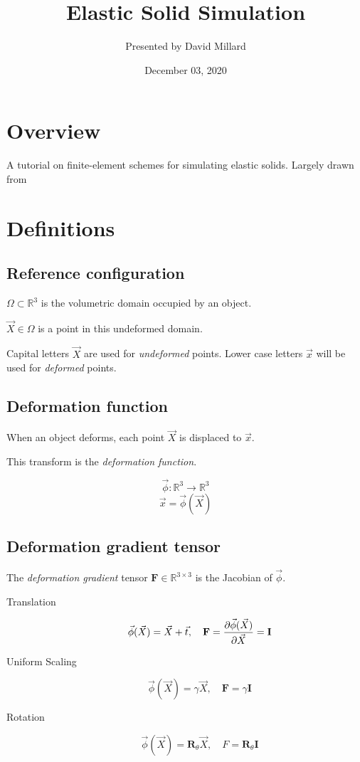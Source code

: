 \documentclass{article}
\title{Elastic Solid Simulation}
\author{Presented by David Millard}
\date{December 03, 2020}
\newcommand{\R}[1]{\ensuremath{\mathbb{R}^{#1}}}
\newcommand{\Rx}[2]{\ensuremath{\mathbb{R}^{#1 \times #2}}}
\newcommand{\vx}{\ensuremath{\vec{x}}}
\newcommand{\vX}{\ensuremath{\vec{X}}}
\newcommand{\vphi}{\ensuremath{\vec{\phi}}}
\newcommand{\vphiX}{\ensuremath{\vec{\phi}(\vX)}}
\newcommand{\F}{\ensuremath{\mathbf{F}}}
\newcommand{\I}{\ensuremath{\mathbf{I}}}
\begin{document}
\maketitle
\thispagestyle{empty}

\section{Overview}

\vspace{1em}
{\huge
  A tutorial on finite-element schemes for simulating elastic solids. Largely
  drawn from \cite{sifakis2012fem}
}

\pagebreak
\section{Definitions}

\subsection{Reference configuration}

$\Omega \subset \R{3}$ is the volumetric domain occupied by an object.

$\vX \in \Omega$ is a point in this undeformed domain.

\begin{tcolorbox}[title=Note]
  Capital letters $\vX$ are used for \emph{undeformed} points. Lower case
  letters $\vx$ will be used for \emph{deformed} points.
\end{tcolorbox}

\pagebreak
\subsection{Deformation function}
When an object deforms, each point $\vX$ is displaced to $\vx$.

This transform is the \emph{deformation function}.

$$\vphi : \R{3} \to \R{3}$$
$$\vx = \vphiX$$

\subsection{Deformation gradient tensor}

The \emph{deformation gradient} tensor $\F \in \Rx{3}{3}$ is the
Jacobian of $\vphi$.

\pagebreak
\begin{tcolorbox}[title=Examples]
  \begin{description}
    \item[Translation] $$\vphiX = \vX + \vec{t}, \quad \F = \pdv{\vphiX}{\vX} = \I$$
    \item[Uniform Scaling] $$\vphiX = \gamma\vX, \quad \F = \gamma\I$$
    \item[Rotation] $$\vphiX = \mathbf{R}_{\theta}\vX, \quad F = \mathbf{R}_{\theta}\I$$
  \end{description}
\end{tcolorbox}
\end{document}
